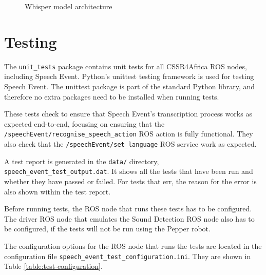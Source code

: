 \documentclass{CSSRforAfrica}
\begin{document}
\begin{figure}[thb]
\begin{center}
\end{center}
\caption{Whisper model architecture}
\label{fig:whisper}
\end{figure}


\newpage
\section{Testing}
The \texttt{unit\_tests} package contains unit tests for all CSSR4Africa ROS nodes, including Speech Event. Python's unittest testing framework is used for testing Speech Event. The unittest package is part of the standard Python library, and therefore no extra packages need to be installed when running tests.

These tests check to ensure that Speech Event's transcription process works as expected end-to-end, focusing on ensuring that the \texttt{/speechEvent/recognise\_speech\_action} ROS action is fully functional. They also check that the \texttt{/speechEvent/set\_language} ROS service work as expected.

A test report is generated in the \texttt{data/} directory, \texttt{speech\_event\_test\_output.dat}. It shows all the tests that have been run and whether they have passed or failed. For tests that err, the reason for the error is also shown within the test report.

Before running tests, the ROS node that runs these tests has to be configured. The driver ROS node that emulates the Sound Detection ROS node also has to be configured, if the tests will not be run using the Pepper robot.

The configuration options for the ROS node that runs the tests are located in the configuration file \texttt{speech\_event\_test\_configuration.ini}. They are shown in Table \ref{table:test-configuration}.
\end{document}
